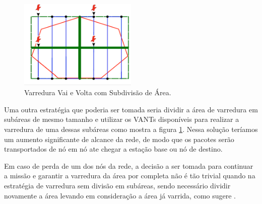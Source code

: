 \begin{figure} 
\center
\includegraphics[width=0.5\textwidth]{comsubdivisao.png}
\caption{Varredura Vai e Volta com Subdivisão de Área.} 
\label{fig:comsubdivisao}
\end{figure}

Uma outra estratégia que poderia ser tomada seria dividir a área de varredura em subáreas de mesmo tamanho e utilizar os VANTs disponíveis para realizar a varredura de uma dessas subáreas como mostra a figura \ref{fig:comsubdivisao}. Nessa solução teríamos um aumento significante de alcance da rede, de modo que os pacotes serão transportados de nó em nó ate chegar a estação base ou nó de destino.

Em caso de perda de um dos nós da rede, a decisão a ser tomada para continuar a missão e garantir a varredura da área por completa não é tão trivial quando na estratégia de varredura sem divisão em subáreas, sendo necessário dividir novamente a área levando em consideração a área já varrida, como sugere \cite{marro2013path}.





